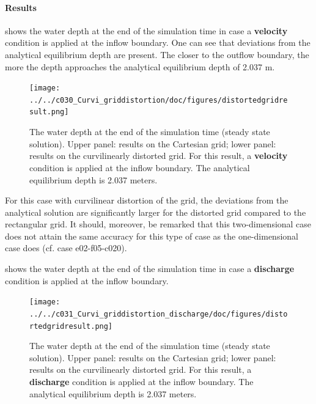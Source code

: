 \paragraph*{Results}
 shows the water depth at the end of the simulation time in case a \textbf{velocity} condition is applied at the inflow boundary. One can see that deviations from the analytical equilibrium depth are present. The closer to the outflow boundary, the more the depth approaches the analytical equilibrium depth of 2.037 m.

\begin{figure}[h!]
\begin{center}
\texttt{[image: ../../c030\_Curvi\_griddistortion/doc/figures/distortedgridresult.png]}
\end{center}\caption{The water depth at the end of the simulation time (steady state solution). Upper panel: results on the Cartesian grid; lower panel: results on the curvilinearly distorted grid. For this result, a \textbf{velocity} condition is applied at the inflow boundary. The analytical equilibrium depth is 2.037 meters. \label{fig:distortedgridresult}}
\end{figure} 

For this case with curvilinear distortion of the grid, the deviations from the analytical solution are significantly larger for the distorted grid compared to the rectangular grid. It should, moreover, be remarked that this two-dimensional case does not attain the same accuracy for this type of case as the one-dimensional case does (cf. case e02-f05-c020).


 shows the water depth at the end of the simulation time in case a \textbf{discharge} condition is applied at the inflow boundary.

\begin{figure}[h!]
\begin{center}
\texttt{[image: ../../c031\_Curvi\_griddistortion\_discharge/doc/figures/distortedgridresult.png]}
\end{center}\caption{The water depth at the end of the simulation time (steady state solution). Upper panel: results on the Cartesian grid; lower panel: results on the curvilinearly distorted grid. For this result, a \textbf{discharge} condition is applied at the inflow boundary. The analytical equilibrium depth is 2.037 meters. \label{fig:distortedgridresultdischarge}}
\end{figure} 

